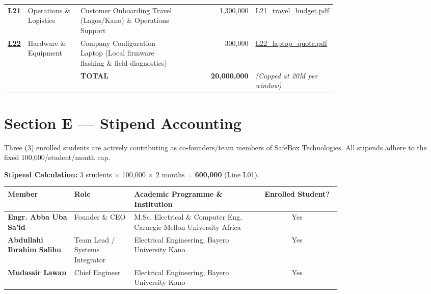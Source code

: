 \documentclass[11pt,a4paper]{article}
\begin{document}
{\begin{longtable}{p{0.05\linewidth} p{0.16\linewidth} p{0.32\linewidth} r p{0.22\linewidth}}
    \href{https://drive.google.com/drive/folders/safebox_window1_evidence/L21_travel_budget.pdf}{\textbf{L21}} & Operations \& Logistics & Customer Onboarding Travel (Lagos/Kano) \& Operations Support & 1,300,000 & \href{https://drive.google.com/drive/folders/safebox_window1_evidence/L21_travel_budget.pdf}{L21\_travel\_budget.pdf} \\
    \href{https://drive.google.com/drive/folders/safebox_window1_evidence/L22_laptop_quote.pdf}{\textbf{L22}} & Hardware \& Equipment & Company Configuration Laptop (Local firmware flashing \& field diagnostics) & 300,000 & \href{https://drive.google.com/drive/folders/safebox_window1_evidence/L22_laptop_quote.pdf}{L22\_laptop\_quote.pdf} \\
    \midrule
    & & \textbf{TOTAL} & \textbf{20,000,000} & \textit{(Capped at \text{₦}20M per window)} \\
    \bottomrule
\end{longtable}
}

\vspace{0.3cm}

\section{Section E --- Stipend Accounting}
Three (3) enrolled students are actively contributing as co-founders/team members of SafeBox Technologies. All stipends adhere to the fixed 100,000/student/month cap.

\textbf{Stipend Calculation:} 3 students $\times$ 100,000 $\times$ 2 months = \textbf{600,000} (Line L01).

\renewcommand{\arraystretch}{1.3}
{\small
\begin{longtable}{p{0.20\linewidth} p{0.18\linewidth} p{0.38\linewidth} c}
    \toprule
    \textbf{Member} & \textbf{Role} & \textbf{Academic Programme \& Institution} & \textbf{Enrolled Student?} \\
    \midrule
    \textbf{Engr. Abba Uba Sa'id} & Founder \& CEO & M.Sc. Electrical \& Computer Eng, Carnegie Mellon University Africa & Yes \\
    \textbf{Abdullahi Ibrahim Salihu} & Team Lead / Systems Integrator & Electrical Engineering, Bayero University Kano & Yes \\
    \textbf{Mudassir Lawan} & Chief Engineer & Electrical Engineering, Bayero University Kano & Yes \\
    \bottomrule
\end{longtable}
}
\end{document}
